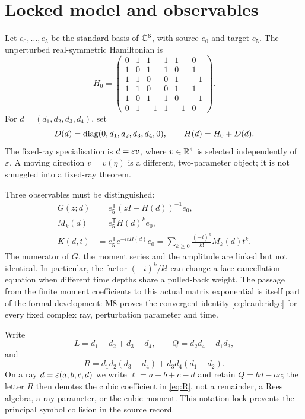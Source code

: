 \section{Locked model and observables}\label{sec:model}

Let \(e_0,\ldots,e_5\) be the standard basis of \(\mathbb C^6\), with source \(e_0\)
and target \(e_5\).  The unperturbed real-symmetric Hamiltonian is
\begin{equation}\label{eq:H0}
H_0=\begin{pmatrix}
0&1&1&1&1&0\\
1&0&1&1&0&1\\
1&1&0&0&1&-1\\
1&1&0&0&1&1\\
1&0&1&1&0&-1\\
0&1&-1&1&-1&0
\end{pmatrix}.
\end{equation}
For \(d=(d_1,d_2,d_3,d_4)\), set
\begin{equation}
D(d)=\operatorname{diag}(0,d_1,d_2,d_3,d_4,0),\qquad H(d)=H_0+D(d).
\end{equation}
The fixed-ray specialisation is \(d=\varepsilon v\), where \(v\in\mathbb R^4\) is selected
independently of \(\varepsilon\).  A moving direction \(v=v(\eta)\) is a different,
two-parameter object; it is not smuggled into a fixed-ray theorem.

Three observables must be distinguished:
\begin{align}
G(z;d)&=e_5^{\mathsf T}(zI-H(d))^{-1}e_0,\label{eq:resolvent}\\
M_k(d)&=e_5^{\mathsf T}H(d)^ke_0,\label{eq:moment}\\
K(d,t)&=e_5^{\mathsf T}e^{-itH(d)}e_0
       =\sum_{k\ge0}\frac{(-i)^k}{k!}M_k(d)t^k.\label{eq:amplitude}
\end{align}
The numerator of \(G\), the moment series and the amplitude are linked but not
identical.  In particular, the factor \((-i)^k/k!\) can change a face
cancellation equation when different time depths share a pulled-back weight.
The passage from the finite moment coefficients to this actual matrix
exponential is itself part of the formal development: M8 proves the convergent
identity \cref{eq:leanbridge} for every fixed complex ray, perturbation
parameter and time.

Write
\begin{equation}\label{eq:threeforms}
L=d_1-d_2+d_3-d_4,\qquad Q=d_2d_4-d_1d_3,
\end{equation}
and
\begin{equation}\label{eq:R}
R=d_1d_2(d_3-d_4)+d_3d_4(d_1-d_2).
\end{equation}
On a ray \(d=\varepsilon(a,b,c,d)\) we write
\(\ell=a-b+c-d\) and retain \(Q=bd-ac\); the letter \(R\) then denotes the
cubic coefficient in \cref{eq:R}, not a remainder, a Rees algebra, a ray
parameter, or the cubic moment.  This notation lock prevents the principal
symbol collision in the source record.

